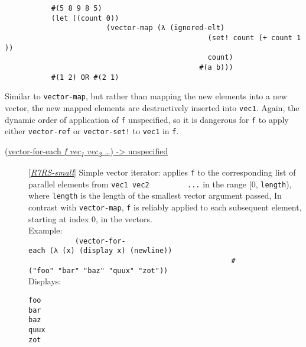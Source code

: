 \begin{description}
\texttt{\ \ \ \ \ \ \ \ \ \ \ \#(5\ 8\ 9\ 8\ 5)\ \ \ \ \ \ \ \ \ }\\[2\baselineskip]\texttt{\ \ \ \ \ \ \ \ \ \ \ (let\ ((count\ 0))\ \ \ \ \ \ \ \ \ }\\
\texttt{\ \ \ \ \ \ \ \ \ \ \ ~~\ \ \ \ \ \ \ \ \ \ \ (vector-map\ (λ\ (ignored-elt)\ \ \ \ \ \ \ \ \ }\\
\texttt{\ \ \ \ \ \ \ \ \ \ \ ~~~~~~~~~~\ \ \ \ \ \ \ \ \ \ \ ~~~~~\ \ \ \ \ \ \ \ \ \ \ (set!\ count\ (+\ count\ 1))\ \ \ \ \ \ \ \ \ }\\
\texttt{\ \ \ \ \ \ \ \ \ \ \ ~~~~~~~~~~\ \ \ \ \ \ \ \ \ \ \ ~~~~~\ \ \ \ \ \ \ \ \ \ \ count)\ \ \ \ \ \ \ \ \ }\\
\texttt{\ \ \ \ \ \ \ \ \ \ \ ~~~~~~~~~~\ \ \ \ \ \ \ \ \ \ \ ~~~\ \ \ \ \ \ \ \ \ \ \ \textquotesingle{}\#(a\ b)))\ \ \ \ \ \ \ \ \ }\\
\texttt{\ \ \ \ \ \ \ \ \ \ \ \#(1\ 2)\ OR\ \#(2\ 1)\ \ \ \ \ \ \ \ \ }\\[2\baselineskip]
\end{description}

\begin{description}
\tightlist
\item[ \href{}{(vector-map! \emph{f vec\textsubscript{1}
vec\textsubscript{2} \ldots{}}) -\textgreater{} unspecified} ]
Similar to \texttt{vector-map}, but rather than mapping the new elements
into a new vector, the new mapped elements are destructively inserted
into \texttt{vec1}. Again, the dynamic order of application of
\texttt{f} unspecified, so it is dangerous for \texttt{f} to apply
either \texttt{vector-ref} or \texttt{vector-set!} to \texttt{vec1} in
\texttt{f}.\\
\end{description}

\begin{description}
\item[ \href{}{(vector-for-each \emph{f vec\textsubscript{1}
vec\textsubscript{2} \ldots{}}) -\textgreater{} unspecified} ]
{[}\protect\hyperlink{R7RS-small}{\emph{R7RS-small}}{]} Simple vector
iterator: applies \texttt{f} to the corresponding list of parallel
elements from \texttt{vec1\ vec2\ \ \ \ \ \ \ \ \ ...} in the range
{[}0, \texttt{length}), where \texttt{length} is the length of the
smallest vector argument passed, In contrast with \texttt{vector-map},
\texttt{f} is reliably applied to each subsequent element, starting at
index 0, in the
vectors.\\[2\baselineskip]Example:\\[2\baselineskip]\texttt{\ \ \ \ \ \ \ \ \ \ \ (vector-for-each\ (λ\ (x)\ (display\ x)\ (newline))\ \ \ \ \ \ \ \ \ }\\
\texttt{\ \ \ \ \ \ \ \ \ \ \ ~~~~~~~~~~\ \ \ \ \ \ \ \ \ \ \ ~~~~~\ \ \ \ \ \ \ \ \ \ \ \textquotesingle{}\#("foo"\ "bar"\ "baz"\ "quux"\ "zot"))\ \ \ \ \ \ \ \ \ }\\
Displays:\\

\begin{verbatim}
foo
bar
baz
quux
zot
\end{verbatim}
\end{description}

